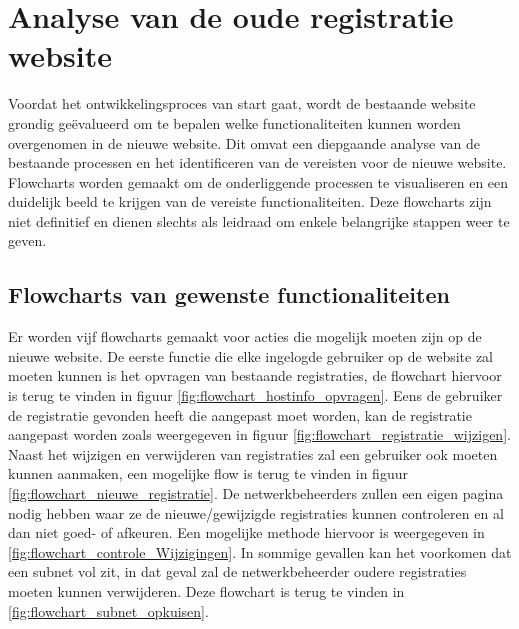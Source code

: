 \section{Analyse van de oude registratie website}
Voordat het ontwikkelingsproces van start gaat, wordt de bestaande website grondig geëvalueerd om te bepalen welke functionaliteiten kunnen worden overgenomen in de nieuwe website. Dit omvat een diepgaande analyse van de bestaande processen en het identificeren van de vereisten voor de nieuwe website. Flowcharts worden gemaakt om de onderliggende processen te visualiseren en een duidelijk beeld te krijgen van de vereiste functionaliteiten. Deze flowcharts zijn niet definitief en dienen slechts als leidraad om enkele belangrijke stappen weer te geven.

\subsection{Flowcharts van gewenste functionaliteiten}
Er worden vijf flowcharts gemaakt voor acties die mogelijk moeten zijn op de nieuwe website.
De eerste functie die elke ingelogde gebruiker op de website zal moeten kunnen is het opvragen van bestaande registraties, de flowchart hiervoor is terug te vinden in figuur  \ref{fig:flowchart_hostinfo_opvragen}. Eens de gebruiker de registratie gevonden heeft die aangepast moet worden, kan de registratie aangepast worden zoals weergegeven in figuur \ref{fig:flowchart_registratie_wijzigen}. Naast het wijzigen en verwijderen van registraties zal een gebruiker ook moeten kunnen aanmaken, een mogelijke flow is terug te vinden in figuur \ref{fig:flowchart_nieuwe_registratie}.
De netwerkbeheerders zullen een eigen pagina nodig hebben waar ze de nieuwe/gewijzigde registraties kunnen controleren en al dan niet goed- of afkeuren. Een mogelijke methode hiervoor is weergegeven in \ref{fig:flowchart_controle_Wijzigingen}. In sommige gevallen kan het voorkomen dat een subnet vol zit, in dat geval zal de netwerkbeheerder oudere registraties moeten kunnen verwijderen. Deze flowchart is terug te vinden in \ref{fig:flowchart_subnet_opkuisen}.

